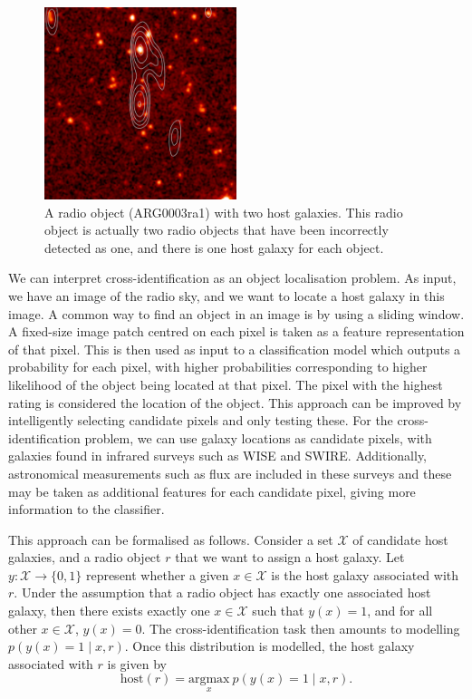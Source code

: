   \begin{figure}[!ht]
    \centering
    \includegraphics[width=0.5\textwidth]{images/CI0370C1_heatmap+contours.png}
    \caption{A radio object (ARG0003ra1) with two host galaxies. This radio
      object is actually two radio objects that have been incorrectly detected
      as one, and there is one host galaxy for each object.}
    \label{fig:two-hosts}
  \end{figure}

  We can interpret cross-identification as an object localisation problem. As
  input, we have an image of the radio sky, and we want to locate a host galaxy
  in this image. A common way to find an object in an image is by using a
  sliding window. A fixed-size image patch centred on each pixel is taken as a
  feature representation of that pixel. This is then used as input to a
  classification model which outputs a probability for each pixel, with higher
  probabilities corresponding to higher likelihood of the object being located
  at that pixel. The pixel with the highest rating is considered the location
  of the object. This approach can be improved by intelligently selecting
  candidate pixels and only testing these. For the cross-identification
  problem, we can use galaxy locations as candidate pixels, with galaxies found
  in infrared surveys such as WISE and SWIRE. Additionally, astronomical
  measurements such as flux are included in these surveys and these may be
  taken as additional features for each candidate pixel, giving more
  information to the classifier.

  This approach can be formalised as follows. Consider a set $\mathcal X$ of
  candidate host galaxies, and a radio object $r$ that we want to assign a
  host galaxy. Let $y : \mathcal X \to \{0, 1\}$ represent whether a given $x
  \in \mathcal X$ is the host galaxy associated with $r$. Under the assumption
  that a radio object has exactly one associated host galaxy, then there exists
  exactly one $x \in \mathcal X$ such that $y(x) = 1$, and for all other $x \in
  \mathcal X$, $y(x) = 0$. The cross-identification task then amounts to
  modelling $p(y(x) = 1 \mid x, r)$. Once this distribution is modelled, the
  host galaxy associated with $r$ is given by
  \begin{equation}
      \label{eq:cross-identification}
      \mbox{host}(r) = \underset{x}{\mbox{argmax}}\ p(y(x) = 1 \mid x, r).
  \end{equation}

